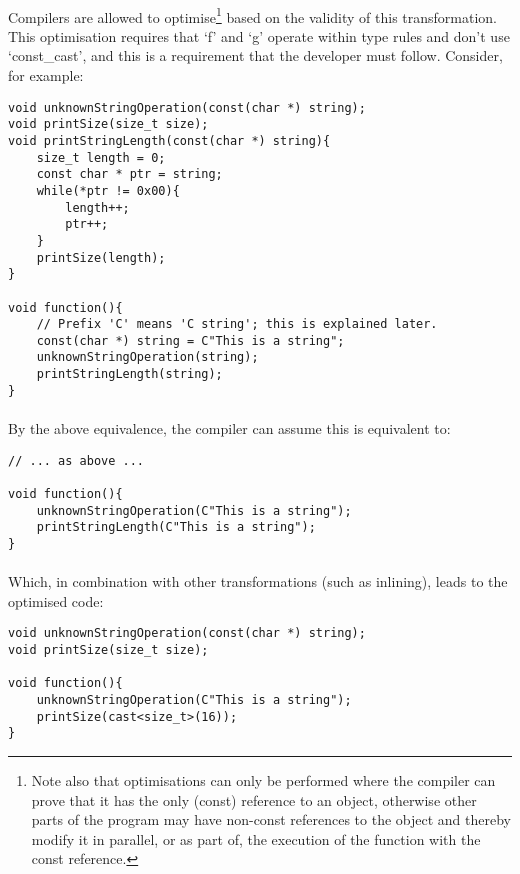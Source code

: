 \documentclass[12pt,twoside,notitlepage]{report}
\begin{document}
\paragraph{}
Compilers are allowed to optimise\footnote{Note also that optimisations can only be performed where the compiler can prove that it has the only (const) reference to an object, otherwise other parts of the program may have non-const references to the object and thereby modify it in parallel, or as part of, the execution of the function with the const reference.} based on the validity of this transformation. This optimisation requires that `f' and `g' operate within type rules and don't use `const\_cast', and this is a requirement that the developer must follow. Consider, for example:

\begin{lstlisting}
void unknownStringOperation(const(char *) string);
void printSize(size_t size);
void printStringLength(const(char *) string){
	size_t length = 0;
	const char * ptr = string;
	while(*ptr != 0x00){
		length++;
		ptr++;
	}
	printSize(length);
}

void function(){
	// Prefix 'C' means 'C string'; this is explained later.
	const(char *) string = C"This is a string";
	unknownStringOperation(string);
	printStringLength(string);
}
\end{lstlisting}

\paragraph{}
By the above equivalence, the compiler can assume this is equivalent to:

\begin{lstlisting}
// ... as above ...

void function(){
	unknownStringOperation(C"This is a string");
	printStringLength(C"This is a string");
}
\end{lstlisting}

\paragraph{}
Which, in combination with other transformations (such as inlining), leads to the optimised code:

\begin{lstlisting}
void unknownStringOperation(const(char *) string);
void printSize(size_t size);

void function(){
	unknownStringOperation(C"This is a string");
	printSize(cast<size_t>(16));
}
\end{lstlisting}
\end{document}
